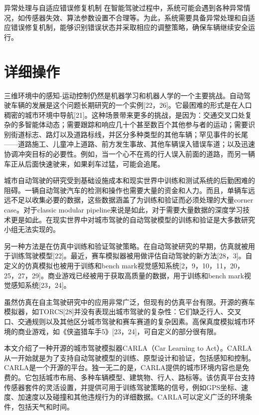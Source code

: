 异常处理与自适应错误修复机制
在智能驾驶过程中，系统可能会遇到各种异常情况，如传感器失效、算法参数设置不合理等。​为此，系统需要具备异常处理和自适应错误修复机制，能够识别错误状态并采取相应的调整策略，确保车辆继续安全运行。 

\section{详细操作}

三维环境中的感知-运动控制仍然是机器学习和机器人学的一个主要挑战。自动驾驶车辆的发展是这个问题长期研究的一个实例[22，26]。它最困难的形式是在人口稠密的城市环境中导航[21]。这种场景带来更多的挑战，是因为：交通交叉口处复杂的多智能体动态；需要跟踪和响应几十个甚至数百个其他参与者的运动；需要识别街道标志、路灯以及道路标线，并区分多种类型的其他车辆；罕见事件的长尾——道路施工、儿童冲上道路、前方发生事故、其他车辆误入错误车道；以及迅速协调冲突目标的必要性。例如，当一个心不在焉的行人误入前面的道路，而另一辆车正从后面快速驶来，如果刹车过猛，可能会追尾。

城市自动驾驶的研究受到基础设施成本和现实世界中训练和测试系统的后勤困难的阻碍。一辆自动驾驶汽车的检测和操作也需要大量的资金和人力。而且，单辆车远远不足以收集必要的数据，这些数据涵盖了为训练和验证而必须处理的大量corner case。对于classic modular pipeline来说是如此，对于需要大量数据的深度学习技术更是如此。在现实世界中对城市驾驶的自动驾驶模型的训练和验证是大多数研究小组无法实现的。

另一种方法是在仿真中训练和验证驾驶策略。在自动驾驶研究的早期，仿真就被用于训练驾驶模型[22]。最近，赛车模拟器被用做评估自动驾驶的新方法[28，3]。自定义的仿真模拟也被用于训练和bench mark视觉感知系统[2，9，10，11，20，25，27，29]。商业游戏已经被用于获取高质量的数据，用于训练和bench mark视觉感知系统[23，24]。

虽然仿真在自主驾驶研究中的应用非常广泛，但现有的仿真平台有限。开源的赛车模拟器，如TORCS[28]并没有表现出城市驾驶的复杂性：它们缺乏行人、交叉口、交通规则以及其他区分城市驾驶和赛车赛道的复杂因素。高保真度模拟城市环境的商业游戏，如《侠盗猎车手5》[23，24]，可自定义的部分很有限。

本文介绍了一种开源的城市驾驶模拟器CARLA（Car Learning to Act）。CARLA从一开始就是为了支持自动驾驶模型的训练、原型设计和验证，包括感知和控制。CARLA是一个开源的平台。独一无二的是，CARLA提供的城市环境内容也是免费的。它包括城市布局、多种车辆模型、建筑物、行人、路标等。该仿真平台支持传感器套件的灵活设置，并提供可用于训练驾驶策略的信号，例如GPS坐标、速度、加速度以及碰撞和其他违规行为的详细数据。CARLA可以定义广泛的环境条件，包括天气和时间。

